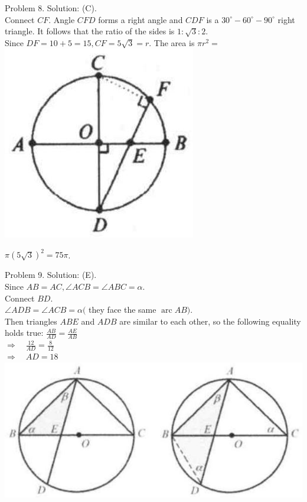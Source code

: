 \documentclass[10pt]{article}
\begin{document}
Problem 8. Solution: (C).\\
Connect \(C F\). Angle \(C F D\) forms a right angle and \(C D F\) is a \(30^{\circ}-60^{\circ}-90^{\circ}\) right triangle. It follows that the ratio of the sides is \(1: \sqrt{3}: 2\).\\
Since \(D F=10+5=15, C F=5 \sqrt{3}=r\). The area is \(\pi r^{2}=\)\\
\includegraphics[max width=\textwidth, center]{2025_04_17_97bc1f7e44d93c271a88g-173(2)}


\(\pi(5 \sqrt{3})^{2}=75 \pi\).

Problem 9. Solution: (E).\\
Since \(A B=A C, \angle A C B=\angle A B C=\alpha\).\\
Connect \(B D\).\\
\(\angle A D B=\angle A C B=\alpha(\) they face the same \(\operatorname{arc} A B)\).\\
Then triangles \(A B E\) and \(A D B\) are similar to each other, so the following equality holds true: \(\frac{A B}{A D}=\frac{A E}{A B}\)\\
\(\Rightarrow \quad \frac{12}{A D}=\frac{8}{12}\)\\
\(\Rightarrow \quad A D=18\)\\
\includegraphics[max width=\textwidth, center]{2025_04_17_97bc1f7e44d93c271a88g-174}
\end{document}
